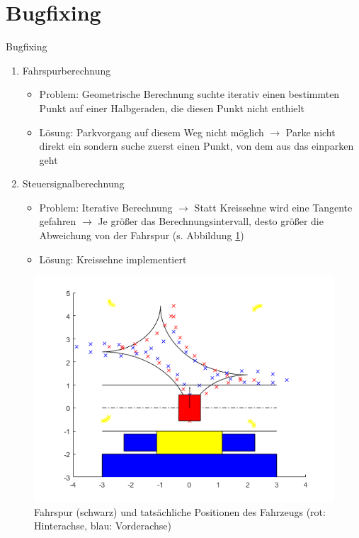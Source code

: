 \documentclass[12pt]{beamer}
\begin{document}
\section{Bugfixing}
\begin{frame}{Bugfixing}
	\begin{enumerate}
		\item Fahrspurberechnung
		\begin{itemize}
			\item Problem: Geometrische Berechnung suchte iterativ einen bestimmten Punkt auf einer Halbgeraden, die diesen Punkt nicht enthielt
			\item Lösung: Parkvorgang auf diesem Weg nicht möglich $\rightarrow$ Parke nicht direkt ein sondern suche zuerst einen Punkt, von dem aus das einparken geht
		\end{itemize}
		\item Steuersignalberechnung
		\begin{itemize}
			\item Problem: Iterative Berechnung $\rightarrow$ Statt Kreissehne wird eine Tangente gefahren $\rightarrow$ Je größer das Berechnungsintervall, desto größer die Abweichung von der Fahrspur (s. Abbildung \ref{fig:trace})
			\item Lösung: Kreissehne implementiert
		\end{itemize}
	\end{enumerate}
\end{frame}
\begin{frame}
	
	\begin{figure}%
		\includegraphics[width=.75\columnwidth]{images/trace}%
		\caption{Fahrspur (schwarz) und tatsächliche Positionen des Fahrzeugs (rot: Hinterachse, blau: Vorderachse)}%
		\label{fig:trace}%
	\end{figure}
\end{frame}
\end{document}
